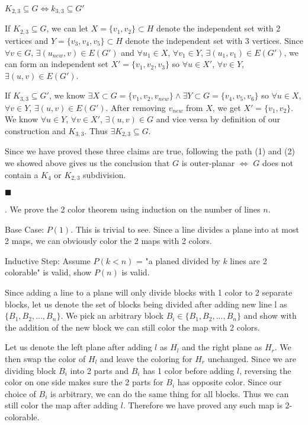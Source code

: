 \documentclass[12pt]{article}
\begin{document}
	  $K_{2,3} \subseteq G \iff k_{3,3} \subseteq G'$
	
	If $K_{2,3} \subseteq G$, we can let $X = \{v_1,v_2\} \subset H$ denote the independent set with 2 vertices and $Y = \{v_3,v_4,v_5\} \subset H$ denote the independent set with 3 vertices. Since $\forall v \in G$, $\exists (u_{new},v) \in E(G')$ and $\forall u_1 \in X$, $\forall v_1 \in Y$, $\exists (u_1,v_1) \in E(G')$, we can form an independent set $X' = \{v_1,v_2,v_3\}$ so $\forall u \in X'$, $\forall v \in Y$, $\exists (u,v) \in E(G')$. 
	
	If $K_{3,3} \subseteq G'$, we know $\exists X \subset G = \{v_1,v_2,v_{new}\} \land \exists Y \subset G = \{v_4,v_5,v_6\}$ so $\forall u \in X$, $\forall v \in Y$, $\exists (u,v) \in E(G')$. After removing $v_{new}$ from $X$, we get $X' = \{v_1,v_2\}$. We know $\forall u \in Y$, $\forall v \in X'$, $\exists (u,v) \in G$ and vice versa by definition of our construction and $K_{3,3}$. Thus $\exists K_{2,3} \subseteq G$. 
	
	Since we have proved these three claims are true, following the path (1) and (2) we showed above gives us the conclusion that $G$ is outer-planar $\iff$ $G$ does not contain a $K_4$ or $K_{2,3}$ subdivision. 
	
		\hfill $\blacksquare$
		
	.  We prove the 2 color theorem using induction on the number of lines $n$.
	
	Base Case: $P(1)$. This is trivial to see. Since a line divides a plane into at most 2 maps, we can obviously color the 2 maps with 2 colors.
	
	Inductive Step: Assume $P(k<n)$ =  "a planed divided by $k$ lines are 2 colorable"  is valid, show $P(n)$ is valid.
	
	Since adding a line to a plane will only divide blocks with 1 color to 2 separate blocks, let us denote the set of blocks being divided after adding new line l as $\{B_1,B_2,..., B_n\}$. We pick an arbitrary block $B_i \in \{B_1,B_2,..., B_n\}$ and show with the addition of the new block we can still color the map with 2 colors. 
	
	Let us denote the left plane after adding $l$ as $H_l$ and the right plane as $H_r$. We then swap the color of $H_l$ and leave the coloring for $H_r$ unchanged. Since we are dividing block $B_i$ into 2 parts and $B_i$ has 1 color before adding $l$, reversing the color on one side makes sure the 2 parts for $B_i$ has opposite color. Since our choice of $B_i$ is arbitrary, we can do the same thing for all blocks. Thus we can still color the map after adding $l$. Therefore we have proved any such map is 2-colorable.
	
\end{document}
